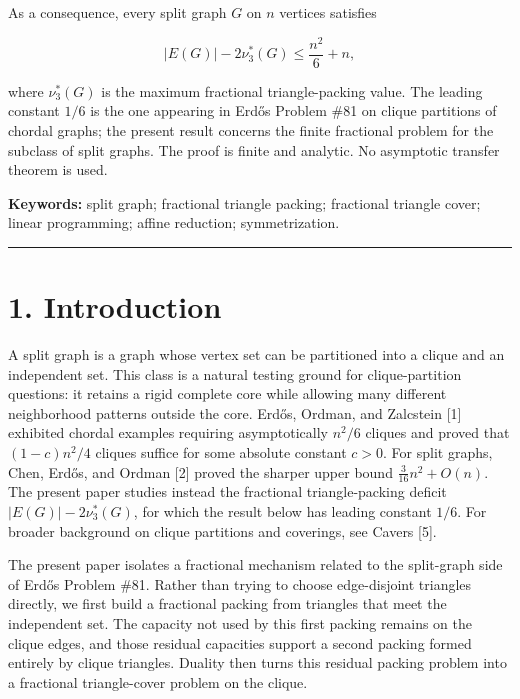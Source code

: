 \documentclass[
  11pt,
]{article}
\begin{document}
As a consequence, every split graph \(G\) on \(n\) vertices satisfies

\[
\boxed{
|E(G)|-2\nu_3^*(G)\le \frac{n^2}{6}+n,
}
\]

where \(\nu_3^*(G)\) is the maximum fractional triangle-packing value.
The leading constant \(1/6\) is the one appearing in Erdős Problem \#81
on clique partitions of chordal graphs; the present result concerns the
finite fractional problem for the subclass of split graphs. The proof is
finite and analytic. No asymptotic transfer theorem is used.

\textbf{Keywords:} split graph; fractional triangle packing; fractional
triangle cover; linear programming; affine reduction; symmetrization.

\begin{center}\rule{0.5\linewidth}{0.5pt}\end{center}

\section{1. Introduction}\label{introduction}

A split graph is a graph whose vertex set can be partitioned into a
clique and an independent set. This class is a natural testing ground
for clique-partition questions: it retains a rigid complete core while
allowing many different neighborhood patterns outside the core. Erdős,
Ordman, and Zalcstein {[}1{]} exhibited chordal examples requiring
asymptotically \(n^2/6\) cliques and proved that \((1-c)n^2/4\) cliques
suffice for some absolute constant \(c>0\). For split graphs, Chen,
Erdős, and Ordman {[}2{]} proved the sharper upper bound
\(\frac{3}{16}n^2+O(n)\). The present paper studies instead the
fractional triangle-packing deficit \(|E(G)|-2\nu_3^*(G)\), for which
the result below has leading constant \(1/6\). For broader background on
clique partitions and coverings, see Cavers {[}5{]}.

The present paper isolates a fractional mechanism related to the
split-graph side of Erdős Problem \#81. Rather than trying to choose
edge-disjoint triangles directly, we first build a fractional packing
from triangles that meet the independent set. The capacity not used by
this first packing remains on the clique edges, and those residual
capacities support a second packing formed entirely by clique triangles.
Duality then turns this residual packing problem into a fractional
triangle-cover problem on the clique.
\end{document}
